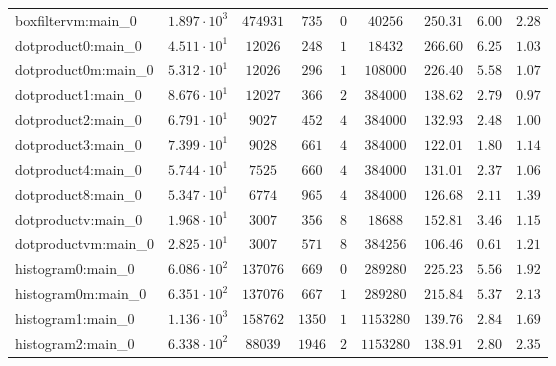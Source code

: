 \begin{tabular}{|l|c|c|c|c|c|c|c|c|}
boxfiltervm:main\_0            & $ 1.897 \cdot 10^{3} $ & $ 474931   $ & $ 735    $ & $ 0    $ & $ 40256    $ & $ 250.31      $ & $ 6.00    $ & $ 2.28    $ \\
dotproduct0:main\_0            & $ 4.511 \cdot 10^{1} $ & $ 12026    $ & $ 248    $ & $ 1    $ & $ 18432    $ & $ 266.60      $ & $ 6.25    $ & $ 1.03    $ \\
dotproduct0m:main\_0           & $ 5.312 \cdot 10^{1} $ & $ 12026    $ & $ 296    $ & $ 1    $ & $ 108000   $ & $ 226.40      $ & $ 5.58    $ & $ 1.07    $ \\
dotproduct1:main\_0            & $ 8.676 \cdot 10^{1} $ & $ 12027    $ & $ 366    $ & $ 2    $ & $ 384000   $ & $ 138.62      $ & $ 2.79    $ & $ 0.97    $ \\
dotproduct2:main\_0            & $ 6.791 \cdot 10^{1} $ & $ 9027     $ & $ 452    $ & $ 4    $ & $ 384000   $ & $ 132.93      $ & $ 2.48    $ & $ 1.00    $ \\
dotproduct3:main\_0            & $ 7.399 \cdot 10^{1} $ & $ 9028     $ & $ 661    $ & $ 4    $ & $ 384000   $ & $ 122.01      $ & $ 1.80    $ & $ 1.14    $ \\
dotproduct4:main\_0            & $ 5.744 \cdot 10^{1} $ & $ 7525     $ & $ 660    $ & $ 4    $ & $ 384000   $ & $ 131.01      $ & $ 2.37    $ & $ 1.06    $ \\
dotproduct8:main\_0            & $ 5.347 \cdot 10^{1} $ & $ 6774     $ & $ 965    $ & $ 4    $ & $ 384000   $ & $ 126.68      $ & $ 2.11    $ & $ 1.39    $ \\
dotproductv:main\_0            & $ 1.968 \cdot 10^{1} $ & $ 3007     $ & $ 356    $ & $ 8    $ & $ 18688    $ & $ 152.81      $ & $ 3.46    $ & $ 1.15    $ \\
dotproductvm:main\_0           & $ 2.825 \cdot 10^{1} $ & $ 3007     $ & $ 571    $ & $ 8    $ & $ 384256   $ & $ 106.46      $ & $ 0.61    $ & $ 1.21    $ \\
histogram0:main\_0             & $ 6.086 \cdot 10^{2} $ & $ 137076   $ & $ 669    $ & $ 0    $ & $ 289280   $ & $ 225.23      $ & $ 5.56    $ & $ 1.92    $ \\
histogram0m:main\_0            & $ 6.351 \cdot 10^{2} $ & $ 137076   $ & $ 667    $ & $ 1    $ & $ 289280   $ & $ 215.84      $ & $ 5.37    $ & $ 2.13    $ \\
histogram1:main\_0             & $ 1.136 \cdot 10^{3} $ & $ 158762   $ & $ 1350   $ & $ 1    $ & $ 1153280  $ & $ 139.76      $ & $ 2.84    $ & $ 1.69    $ \\
histogram2:main\_0             & $ 6.338 \cdot 10^{2} $ & $ 88039    $ & $ 1946   $ & $ 2    $ & $ 1153280  $ & $ 138.91      $ & $ 2.80    $ & $ 2.35    $ \\

\end{tabular}

